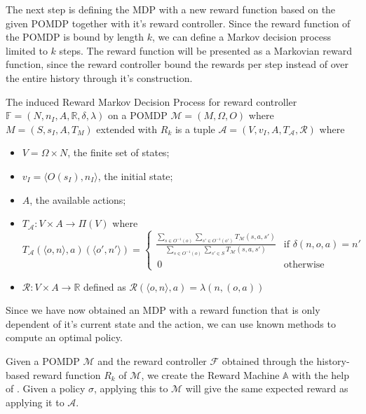 The next step is defining the MDP with a new reward function based on the given POMDP together with it's reward controller. Since the reward function of the POMDP is bound by length $k$, we can define a Markov decision process limited to $k$ steps. The reward function will be presented as a Markovian reward function, since the reward controller bound the rewards per step instead of over the entire history through it's construction. 

\begin{definition}
	\label{def:reward-mdp}
	The induced Reward Markov Decision Process for reward controller $\mathbb{F}=(N, n_I, A, \mathbb{R}, \delta, \lambda)$ on a POMDP $\mathcal{M}=(M,\Omega,O)$ where $M=(S,s_I,A,T_{M})$ extended with $R_k$ is a tuple $\mathcal{A}=(V,v_I,A,T_\mathcal{A},\mathcal{R})$ where 
	\begin{itemize}
		\item $V=\Omega\times N$, the finite set of states;
		\item $v_I=\langle O(s_I),n_I\rangle $, the initial state;
		\item $A$, the available actions;
		\item $T_\mathcal{A}: V \times A\to \Pi(V)$ where
		\begin{equation*}
			T_\mathcal{A}(\langle o, n\rangle,a)(\langle o',n'\rangle)=
			\begin{cases}
				\frac{\sum\limits_{s\in O^{-1}(o)}\sum\limits_{s'\in O^{-1}(o')}T_{\mathcal{M}}(s,a,s')}{\sum\limits_{s\in O^{-1}(o)}\sum\limits_{s'\in S}T_{\mathcal{M}}(s,a,s')} &\text{if } \delta(n,o,a)=n' \\
				\, 0 & \text{otherwise}
			\end{cases}
		\end{equation*}
	\item $\mathcal{R}:V\times A\to\mathbb{R}$ defined as
		$\mathcal{R}(\langle o, n \rangle, a) = \lambda(n,(o,a))$
		\end{itemize}
\end{definition}

Since we have now obtained an MDP with a reward function that is only dependent of it's current state and the action, we can use known methods to compute an optimal policy.

\begin{corollary}
	Given a POMDP $\mathcal{M}$ and the reward controller $\mathcal{F}$ obtained through the history-based reward function $R_k$ of $\mathcal{M}$, we create the Reward Machine $\mathbb{A}$ with the help of . Given a policy $\sigma$, applying this to $\mathcal{M}$ will give the same expected reward as applying it to $\mathcal{A}$.
\end{corollary}

